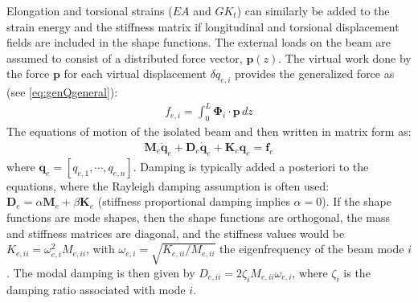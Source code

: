 \documentclass[wes, manuscript]{copernicus}
\renewcommand{\v}[1]{\boldsymbol{#1}}
\newcommand{\m}[1]{\boldsymbol{#1}}
\begin{document}
Elongation and torsional strains ($EA$ and $GK_t$) can similarly be added to the strain energy and the stiffness matrix if longitudinal and torsional displacement fields are included in the shape functions.
% 
The external loads on the beam are assumed to consist of a distributed force vector, $\v{p}(z)$.
The virtual work done by the force $\v{p}$ for each virtual displacement $\delta q_{e,i}$ provides the generalized force as (see \autoref{eq:genQgeneral}): 
\begin{align}
    f_{e,i}=\int_0^L \v{\Phi}_i\cdot \v{p}\, dz
    \label{eq:GenQBeam}
\end{align}
% 
The equations of motion of the isolated beam 
 and then written in matrix form as:
\begin{align}
   \m{M}_e \v{\ddot{q}}_e + \m{D}_e\v{\dot{q}}_e + \v{K}_e\v{q}_e = \v{f}_e
\end{align}
where $\v{q}_e=[q_{e,1},\cdots,q_{e,n}]$. 
Damping is typically added a posteriori to the equations, where the Rayleigh damping assumption is often used: $\v{D}_e=\alpha\m{M}_e+\beta\m{K}_e$ (stiffness proportional damping implies $\alpha=0$).
If the shape functions are mode shapes, then the shape functions are orthogonal, the mass and stiffness matrices are diagonal, and the stiffness values would be $K_{e,ii}=\omega_{e,i}^2 M_{e,ii}$, with $\omega_{e,i}=\sqrt{K_{e,ii}/M_{e,ii}}$ the eigenfrequency of the beam mode $i$.
The modal damping is then given by $D_{e,ii}= 2 \zeta_i M_{e,ii} \omega_{e,i}$, where $\zeta_i$ is the damping ratio associated with mode $i$.
\end{document}
